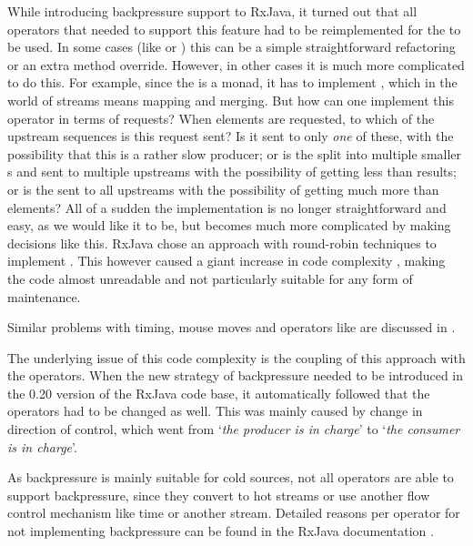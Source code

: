 While introducing backpressure support to RxJava, it turned out that all operators that needed to support this feature had to be reimplemented for the  to be used. In some cases (like  or ) this can be a simple straightforward refactoring or an extra method override. However, in other cases it is much more complicated to do this. For example, since the \obs is a monad, it has to implement , which in the world of streams means mapping and merging. But how can one implement this  operator in terms of requests? When  elements are requested, to which of the  upstream \obs sequences is this request sent? Is it sent to only \emph{one} of these, with the possibility that this is a rather slow producer; or is the  split into multiple smaller s and sent to multiple upstreams with the possibility of getting less than  results; or is the  sent to all upstreams with the possibility of getting much more than  elements? All of a sudden the implementation is no longer straightforward and easy, as we would like it to be, but becomes much more complicated by making decisions like this. RxJava chose an approach with round-robin techniques to implement . This however caused a giant increase in code complexity \cite{RxJava-source-code}, making the code almost unreadable and not particularly suitable for any form of maintenance.

Similar problems with timing, mouse moves and operators like  are discussed in \cite{meijer2014-Derivation}.

The underlying issue of this code complexity is the coupling of this approach with the operators. When the new strategy of backpressure needed to be introduced in the 0.20 version of the RxJava code base, it automatically followed that the operators had to be changed as well. This was mainly caused by change in direction of control, which went from `\textit{the producer is in charge}' to `\textit{the consumer is in charge}'.

As backpressure is mainly suitable for cold sources, not all operators are able to support backpressure, since they convert to hot streams or use another flow control mechanism like time or another stream. Detailed reasons per operator for not implementing backpressure can be found in the RxJava documentation \cite{rx-api}.

